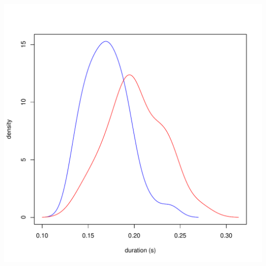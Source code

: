 \documentclass[a4paper,11pt]{article}\usepackage[]{graphicx}\usepackage[]{color}
\makeatletter
\def\maxwidth{ %
  \ifdim\Gin@nat@width>\linewidth
    \linewidth
  \else
    \Gin@nat@width
  \fi
}
\newenvironment{knitrout}{}{} %
\makeatother
\begin{document}
\begin{knitrout}
{\centering \includegraphics[width=\maxwidth]{img/mono-nas-dens-1} 

}



\end{knitrout}
\end{document}
